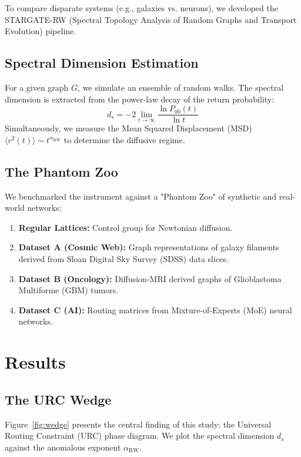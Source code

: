\documentclass[11pt,a4paper]{article}
\begin{document}
To compare disparate systems (e.g., galaxies vs. neurons), we developed the STARGATE-RW (Spectral Topology Analysis of Random Graphs and Transport Evolution) pipeline.

\subsection*{Spectral Dimension Estimation}
For a given graph $G$, we simulate an ensemble of random walks. The spectral dimension is extracted from the power-law decay of the return probability:
\begin{equation}
d_s = -2 \lim_{t \to \infty} \frac{\ln P_{00}(t)}{\ln t}
\end{equation}
Simultaneously, we measure the Mean Squared Displacement (MSD) $\langle r^2(t) \rangle \sim t^{\alpha_{\mathrm{RW}}}$ to determine the diffusive regime.

\subsection*{The Phantom Zoo}
We benchmarked the instrument against a "Phantom Zoo" of synthetic and real-world networks:
\begin{enumerate}
    \item \textbf{Regular Lattices:} Control group for Newtonian diffusion.
    \item \textbf{Dataset A (Cosmic Web):} Graph representations of galaxy filaments derived from Sloan Digital Sky Survey (SDSS) data slices.
    \item \textbf{Dataset B (Oncology):} Diffusion-MRI derived graphs of Glioblastoma Multiforme (GBM) tumors.
    \item \textbf{Dataset C (AI):} Routing matrices from Mixture-of-Experts (MoE) neural networks.
\end{enumerate}

\section*{Results}

\subsection*{The URC Wedge}
Figure~\ref{fig:wedge} presents the central finding of this study: the Universal Routing Constraint (URC) phase diagram. We plot the spectral dimension $d_s$ against the anomalous exponent $\alpha_{\mathrm{RW}}$.
\end{document}
